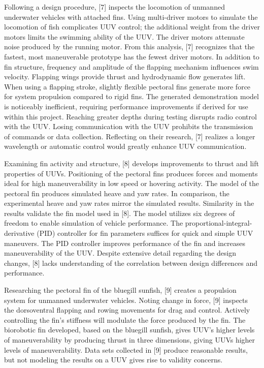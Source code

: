 \documentclass{IEEEtran}
\begin{document}
Following a design procedure, [7] inspects the locomotion of unmanned underwater vehicles with attached fins.  Using multi-driver motors to simulate the locomotion of fish complicates UUV control; the additional weight from the driver motors limits the swimming ability of the UUV.  The driver motors attenuate noise produced by the running motor.  From this analysis, [7] recognizes that the fastest, most maneuverable prototype has the fewest driver motors.  In addition to fin structure, frequency and amplitude of the flapping mechanism influences swim velocity.  Flapping wings provide thrust and hydrodynamic flow generates lift.  When using a flapping stroke, slightly flexible pectoral fins generate more force for system propulsion compared to rigid fins.  The generated demonstration model is noticeably inefficient, requiring performance improvements if derived for use within this project.  Reaching greater depths during testing disrupts radio control with the UUV.  Losing communication with the UUV prohibits the transmission of commands or data collection.  Reflecting on their research, [7] realizes a longer wavelength or automatic control would greatly enhance UUV communication.  

Examining fin activity and structure, [8] develops improvements to thrust and lift properties of UUVs.  Positioning of the pectoral fins produces forces and moments ideal for high maneuverability in low speed or hovering activity.  The model of the pectoral fin produces simulated heave and yaw rates.  In comparison, the experimental heave and yaw rates mirror the simulated results.  Similarity in the results validate the fin model used in [8].  The model utilizes six degrees of freedom to enable simulation of vehicle performance.  The proportional-integral-derivative (PID) controller for fin parameters suffices for quick and simple UUV maneuvers.  The PID controller improves performance of the fin and increases maneuverability of the UUV.  Despite extensive detail regarding the design changes, [8] lacks understanding of the correlation between design differences and performance.  

Researching the pectoral fin of the bluegill sunfish, [9] creates a propulsion system for unmanned underwater vehicles.  Noting change in force, [9] inspects the dorsoventral flapping and rowing movements for drag and control.  Actively controlling the fin’s stiffness will modulate the force produced by the fin.  The biorobotic fin developed, based on the bluegill sunfish, gives UUV’s higher levels of maneuverability by producing thrust in three dimensions, giving UUVs higher levels of maneuverability. Data sets collected in [9] produce reasonable results, but not modeling the results on a UUV gives rise to validity concerns.  
\end{document}
